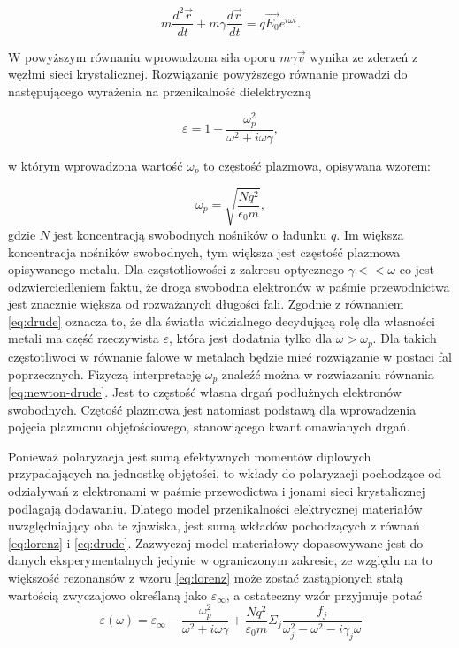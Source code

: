 \begin{equation}
m \frac{d^2\vec{r}}{dt} + m \gamma \frac{d\vec{r}}{dt} = q \vec{E_0}e^{i\omega t}.
\label{eq:newton-drude}
\end{equation}

W powyższym równaniu wprowadzona siła oporu $m \gamma \vec{v}$ wynika ze zderzeń z węzłmi sieci krystalicznej. Rozwiązanie powyższego równanie prowadzi do następującego wyrażenia na przenikalność dielektryczną

\begin{equation}
\varepsilon= 1 - \frac{\omega_p^2}{\omega^2+i\omega \gamma},
\label{eq:drude}
\end{equation}

w którym wprowadzona wartość $\omega_p$ to częstość plazmowa, opisywana wzorem:

\begin{equation}
\omega_p = \sqrt{\frac{N q^2}{\epsilon_0 m}},
\label{eq:omega-plazmowa}
\end{equation}
gdzie $N$ jest koncentracją swobodnych nośników o ładunku $q$. Im większa koncentracja nośników swobodnych, tym większa jest częstość plazmowa opisywanego metalu.  Dla częstotliowości z zakresu optycznego $\gamma<<\omega$ co jest odzwierciedleniem faktu, że droga swobodna elektronów w paśmie przewodnictwa jest znacznie większa od rozważanych długości fali. Zgodnie z równaniem  \ref{eq:drude} oznacza to, że dla światła widzialnego decydującą rolę dla własności metali ma część rzeczywista $\varepsilon$, która jest dodatnia tylko dla $\omega>\omega_p$. Dla takich częstotliwoci w równanie falowe w metalach będzie mieć rozwiązanie w postaci fal poprzecznych. Fizyczą interpretację $\omega_p$ znaleźć można w rozwiazaniu równania \ref{eq:newton-drude}. Jest to częstość własna drgań podłużnych elektronów swobodnych. Czętość plazmowa jest natomiast podstawą dla wprowadzenia pojęcia plazmonu objętościowego, stanowiącego kwant omawianych drgań.

Ponieważ polaryzacja jest sumą efektywnych momentów diplowych przypadających na jednostkę objętości, to wkłady do polaryzacji pochodzące od odziaływań z elektronami w paśmie przewodictwa i jonami sieci krystalicznej podlagają dodawaniu. Dlatego model przenikalności elektrycznej materiałów uwzględniający oba te zjawiska, jest sumą wkładów pochodzących z równań \ref{eq:lorenz} i \ref{eq:drude}. Zazwyczaj model materiałowy dopasowywane jest do danych eksperymentalnych jedynie w ograniczonym zakresie, ze względu na to większość rezonansów z wzoru \ref{eq:lorenz} może zostać zastąpionych stałą wartością zwyczajowo określaną jako $\varepsilon_\infty$, a ostateczny wzór przyjmuje potać
\begin{equation}
\varepsilon(\omega)=\varepsilon_\infty- \frac{\omega_p^2}{\omega^2+i\omega\gamma} +\frac{Nq^2}{\varepsilon_0 m} \Sigma_j \frac{f_j}{\omega_j^2-\omega^2-i\gamma_j\omega}
\label{eq:lorenz-drude}
\end{equation}
